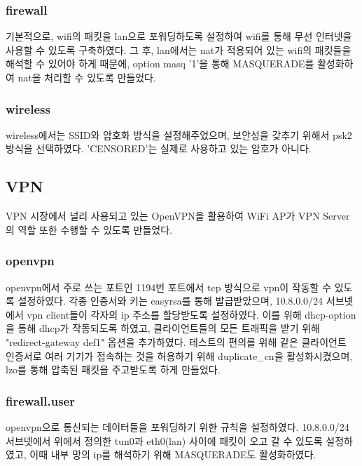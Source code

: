 \documentclass{article}
\begin{document}
    \subsubsection{firewall}
    기본적으로, wifi의 패킷을 lan으로 포워딩하도록 설정하여 wifi를 통해 무선 인터넷을 사용할 수 있도록 구축하였다.
    그 후, lan에서는 nat가 적용되어 있는 wifi의 패킷들을 해석할 수 있어야 하게 때문에,
    option masq '1'을 통해 MASQUERADE를 활성화하여 nat을 처리할 수 있도록 만들었다.



    \subsubsection{wireless}
    wireless에서는 SSID와 암호화 방식을 설정해주었으며, 보안성을 갖추기 위해서 psk2 방식을 선택하였다. 'CENSORED'는 실제로 사용하고 있는 암호가 아니다.



    \subsection{VPN}
    VPN 시장에서 널리 사용되고 있는 OpenVPN을 활용하여 WiFi AP가 VPN Server의 역할 또한 수행할 수 있도록 만들었다.
    \subsubsection{openvpn}
    openvpn에서 주로 쓰는 포트인 1194번 포트에서 tcp 방식으로 vpn이 작동할 수 있도록 설정하였다.
    각종 인증서와 키는 easyrsa를 통해 발급받았으며, 10.8.0.0/24 서브넷에서 vpn client들이 각자의 ip 주소를 할당받도록 설정하였다.
    이를 위해 dhcp-option을 통해 dhcp가 작동되도록 하였고, 클라이언트들의 모든 트래픽을 받기 위해 "redirect-gateway def1" 옵션을 추가하였다.
    테스트의 편의를 위해 같은 클라이언트 인증서로 여러 기기가 접속하는 것을 허용하기 위해 duplicate\_cn을 활성화시켰으며, lzo를 통해 압축된 패킷을 주고받도록 하게 만들었다.
    \subsubsection{firewall.user}
    openvpn으로 통신되는 데이터들을 포워딩하기 위한 규칙을 설정하였다. 10.8.0.0/24 서브넷에서 위에서 정의한 tun0과 eth0(lan) 사이에 패킷이 오고 갈 수 있도록 설정하였고,
    이때 내부 망의 ip를 해석하기 위해 MASQUERADE도 활성화하였다.
\end{document}
